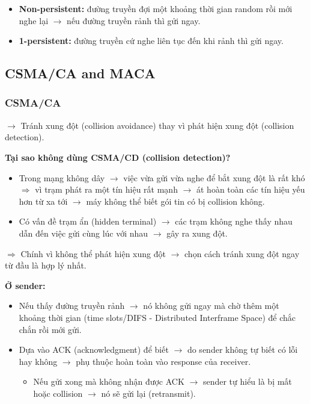 \begin{itemize}
    \item \textbf{Non-persistent:} đường truyền đợi một khoảng thời gian random rồi mới nghe lại $\rightarrow$ nếu đường truyền rảnh thì gửi ngay.
    \item \textbf{1-persistent:} đường truyền cứ nghe liên tục đến khi rảnh thì gửi ngay.
\end{itemize}
\medskip

\subsection{CSMA/CA and MACA}

\subsubsection{CSMA/CA}

\noindent
$\rightarrow$ Tránh xung đột (collision avoidance) thay vì phát hiện xung đột (collision detection).
\medskip

\vspace{0.3cm}

\noindent
\textbf{Tại sao không dùng CSMA/CD (collision detection)?}

\begin{itemize}
    \item Trong mạng không dây $\rightarrow$ việc vừa gửi vừa nghe để bắt xung đột là rất khó $\Rightarrow$ vì trạm phát ra một tín hiệu rất mạnh $\rightarrow$ át hoàn toàn các tín hiệu yếu hơn từ xa tới $\rightarrow$ máy không thể biết gói tin có bị collision không.
    \item Có vấn đề trạm ẩn (hidden terminal) $\rightarrow$ các trạm không nghe thấy nhau dẫn đến việc gửi cùng lúc với nhau $\rightarrow$ gây ra xung đột.
\end{itemize}
\medskip

\noindent
$\Rightarrow$ Chính vì không thể phát hiện xung đột $\rightarrow$ chọn cách tránh xung đột ngay từ đầu là hợp lý nhất.
\medskip

\noindent
\textbf{Ở sender:}

\begin{itemize}
    \item Nếu thấy đường truyền rảnh $\rightarrow$ nó không gửi ngay mà chờ thêm một khoảng thời gian (time slots/DIFS - Distributed Interframe Space) để chắc chắn rồi mới gửi.
    \item Dựa vào ACK (acknowledgment) để biết $\rightarrow$ do sender không tự biết có lỗi hay không $\rightarrow$ phụ thuộc hoàn toàn vào response của receiver. \begin{itemize}
        \item[$\Rightarrow$] Nếu gửi xong mà không nhận được ACK $\rightarrow$ sender tự hiểu là bị mất hoặc collision $\rightarrow$ nó sẽ gửi lại (retransmit).
    \end{itemize}
\end{itemize}
\medskip

